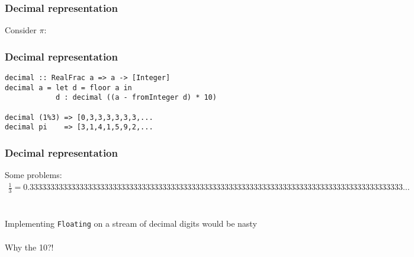 \documentclass[11pt]{beamer}
\begin{document}
\begin{frame}
\frametitle{Decimal representation}
Consider $\pi$:
\end{frame}

\begin{frame}[fragile]
\frametitle{Decimal representation}
\begin{verbatim}
decimal :: RealFrac a => a -> [Integer]
decimal a = let d = floor a in
            d : decimal ((a - fromInteger d) * 10)

decimal (1%3) => [0,3,3,3,3,3,3,...
decimal pi    => [3,1,4,1,5,9,2,...
\end{verbatim}
\end{frame}

\begin{frame}
\frametitle{Decimal representation}
Some problems:
\begin{align*}
\frac{1}{3} = 0.333333333333333333333333333333333333333333333333333333333333333333333333333333333333333333\dots
\end{align*}
\\~\\
Implementing \texttt{Floating} on a stream of decimal digits
would be nasty
\\~\\
Why the 10?!
\end{frame}
\end{document}
